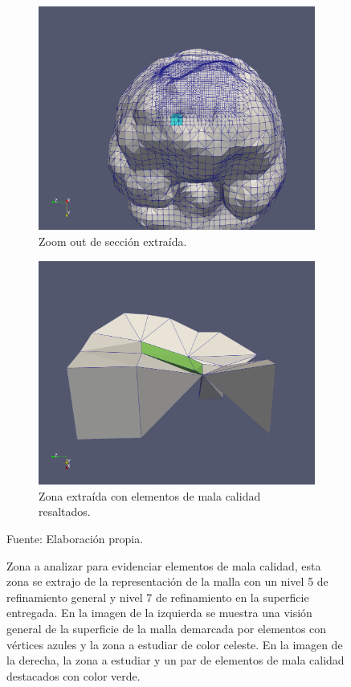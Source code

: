 \begin{figure}[!ht]
    \centering
    \begin{subfigure}[t]{0.45\textwidth}
        \includegraphics[width=1.0\textwidth]{figures/bad_quality_zone/zoom_out_bq_zone.png}
        \caption{Zoom out de sección extraída.}
    \end{subfigure}
    \begin{subfigure}[t]{0.45\textwidth}
        \includegraphics[width=1.0\textwidth]{figures/bad_quality_zone/bq_zone_02.png}
        \caption{Zona extraída con elementos de mala calidad resaltados.}
    \end{subfigure}
    \caption{ Zona a analizar para evidenciar elementos de mala calidad, esta zona se extrajo de la representación de la malla con un nivel 5 de refinamiento general y nivel 7 de refinamiento en la superficie entregada. En la imagen de la izquierda se muestra una visión general de la superficie de la malla demarcada por elementos con vértices azules y la zona a estudiar de color celeste. En la imagen de la derecha, la zona a estudiar y un par de elementos de mala calidad destacados con color verde. }
    Fuente: Elaboración propia.
    \label{fig:zoom_cortex_surf}
\end{figure}

